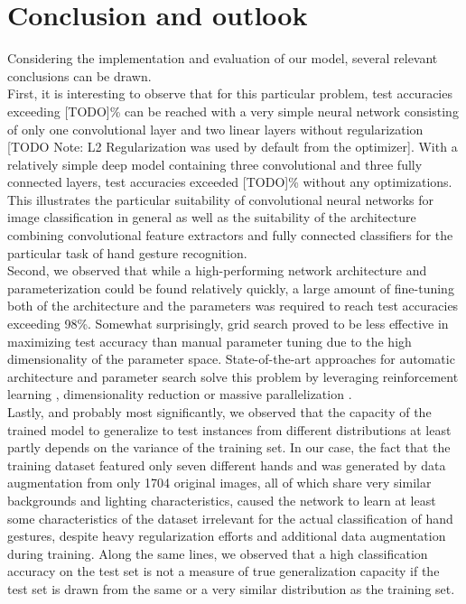 \documentclass[a4paper]{article}
\begin{document}
\section{Conclusion and outlook}
Considering the implementation and evaluation of our model, several relevant conclusions can be drawn.\\
First, it is interesting to observe that for this particular problem, test accuracies exceeding [TODO]\% can be reached with a very simple neural network consisting of only one convolutional layer and two linear layers without regularization [TODO Note: L2 Regularization was used by default from the optimizer]. With a relatively simple deep model containing three convolutional and three fully connected layers, test accuracies exceeded [TODO]\% without any optimizations. This illustrates the particular suitability of convolutional neural networks for image classification in general as well as the suitability of the architecture combining convolutional feature extractors and fully connected classifiers for the particular task of hand gesture recognition.\\
Second, we observed that while a high-performing network architecture and parameterization could be found relatively quickly, a large amount of fine-tuning both of the architecture and the parameters was required to reach test accuracies exceeding 98\%. Somewhat surprisingly, grid search proved to be less effective in maximizing test accuracy than manual parameter tuning due to the high dimensionality of the parameter space. State-of-the-art approaches for automatic architecture and parameter search solve this problem by leveraging reinforcement learning \cite{Zoph2016}, dimensionality reduction \cite{Hinz2018} or massive parallelization \cite{Li2018}.\\
Lastly, and probably most significantly, we observed that the capacity of the trained model to generalize to test instances from different distributions at least partly depends on the variance of the training set. In our case, the fact that the training dataset featured only seven different hands and was generated by data augmentation from only 1704 original images, all of which share very similar backgrounds and lighting characteristics, caused the network to learn at least some characteristics of the dataset irrelevant for the actual classification of hand gestures, despite heavy regularization efforts and additional data augmentation during training. Along the same lines, we observed that a high classification accuracy on the test set is not a measure of true generalization capacity if the test set is drawn from the same or a very similar distribution as the training set.\\
\end{document}
